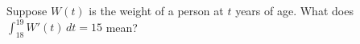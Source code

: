 \documentclass{ximera}
\begin{document}
\begin{problem}
  Suppose $W(t)$ is the weight of a person at $t$ years of age.  What does $\int_{18}^{19} W'(t) \, dt = 15$ mean?
  \begin{multipleChoice}
  \end{multipleChoice}
\end{problem}




\end{document}
